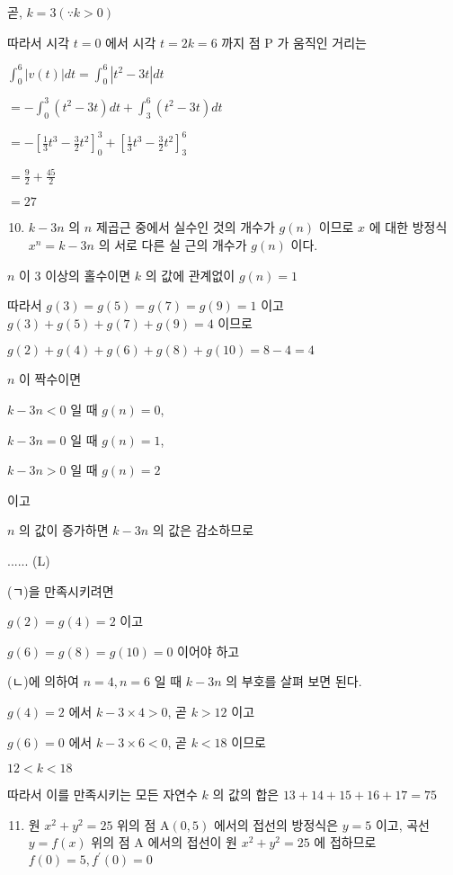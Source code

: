 \documentclass[10pt]{article}
\begin{document}
곧, \(k=3(\because k>0)\)

따라서 시각 \(t=0\) 에서 시각 \(t=2 k=6\) 까지 점 P 가 움직인 거리는

\(\int_{0}^{6}|v(t)| d t=\int_{0}^{6}\left|t^{2}-3 t\right| d t\)

\(=-\int_{0}^{3}\left(t^{2}-3 t\right) d t+\int_{3}^{6}\left(t^{2}-3 t\right) d t\)

\(=-\left[\frac{1}{3} t^{3}-\frac{3}{2} t^{2}\right]_{0}^{3}+\left[\frac{1}{3} t^{3}-\frac{3}{2} t^{2}\right]_{3}^{6}\)

\(=\frac{9}{2}+\frac{45}{2}\)

\(=27\)

\begin{enumerate}
  \setcounter{enumi}{9}
  \item \(k-3 n\) 의 \(n\) 제곱근 중에서 실수인 것의 개수가 \(g(n)\) 이므로 \(x\) 에 대한 방정식 \(x^{n}=k-3 n\) 의 서로 다른 실 근의 개수가 \(g(n)\) 이다.
\end{enumerate}

\(n\) 이 3 이상의 홀수이면 \(k\) 의 값에 관계없이 \(g(n)=1\)

따라서 \(g(3)=g(5)=g(7)=g(9)=1\) 이고 \(g(3)+g(5)+g(7)+g(9)=4\) 이므로

\(g(2)+g(4)+g(6)+g(8)+g(10)=8-4=4\)

\(n\) 이 짝수이면

\(k-3 n<0\) 일 때 \(g(n)=0\),

\(k-3 n=0\) 일 때 \(g(n)=1\),

\(k-3 n>0\) 일 때 \(g(n)=2\)

이고

\(n\) 의 값이 증가하면 \(k-3 n\) 의 값은 감소하므로

...... (L)

(ㄱ)을 만족시키려면

\(g(2)=g(4)=2\) 이고

\(g(6)=g(8)=g(10)=0\) 이어야 하고

(ㄴ)에 의하여 \(n=4, n=6\) 일 때 \(k-3 n\) 의 부호를 살펴 보면 된다.

\(g(4)=2\) 에서 \(k-3 \times 4>0\), 곧 \(k>12\) 이고

\(g(6)=0\) 에서 \(k-3 \times 6<0\), 곧 \(k<18\) 이므로

\(12<k<18\)

따라서 이를 만족시키는 모든 자연수 \(k\) 의 값의 합은 \(13+14+15+16+17=75\)

\begin{enumerate}
  \setcounter{enumi}{10}
  \item 원 \(x^{2}+y^{2}=25\) 위의 점 \(\mathrm{A}(0,5)\) 에서의 접선의 방정식은 \(y=5\) 이고, 곡선 \(y=f(x)\) 위의 점 A 에서의 접선이 원 \(x^{2}+y^{2}=25\) 에 접하므로 \(f(0)=5, f^{\prime}(0)=0\)
\end{enumerate}
\end{document}
